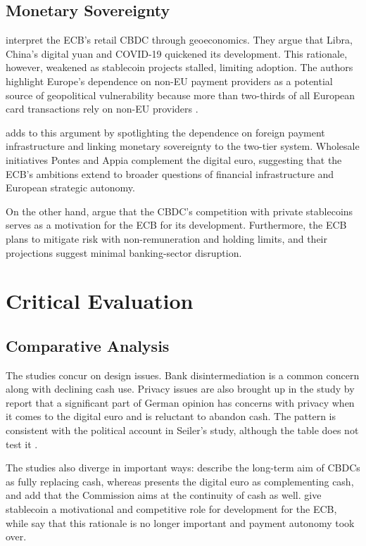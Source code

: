\documentclass[10pt,a4paper,twocolumn]{article}
\begin{document}
\subsection{Monetary Sovereignty}

\textcite{Quaglia2025} interpret the ECB's retail CBDC through geoeconomics. They argue that Libra, China's digital yuan and COVID-19 quickened its development. This rationale, however, weakened as stablecoin projects stalled, limiting adoption. The authors highlight Europe's dependence on non-EU payment providers as a potential source of geopolitical vulnerability because more than two-thirds of all European card transactions rely on non-EU providers \parencite{Quaglia2025}.

\textcite{Cipollone2026a} adds to this argument by spotlighting the dependence on foreign payment infrastructure and linking monetary sovereignty to the two-tier system. Wholesale initiatives Pontes and Appia complement the digital euro, suggesting that the ECB's ambitions extend to broader questions of financial infrastructure and European strategic autonomy.

On the other hand, \textcite{Cotugno2024} argue that the CBDC's competition with private stablecoins serves as a motivation for the ECB for its development. Furthermore, the ECB plans to mitigate risk with non-remuneration and holding limits, and their projections suggest minimal banking-sector disruption.

\vspace{2cm}
\section{Critical Evaluation}

\subsection{Comparative Analysis}

The studies concur on design issues. Bank disintermediation is a common concern along with declining cash use. Privacy issues are also brought up in the study by \textcite{Quaglia2025} report that a significant part of German opinion has concerns with privacy when it comes to the digital euro and is reluctant to abandon cash. The pattern is consistent with the political account in Seiler's study, although the table does not test it \parencite{Seiler2026}.

The studies also diverge in important ways: \textcite{Cotugno2024} describe the long-term aim of CBDCs as fully replacing cash, whereas \textcite{Cipollone2026a} presents the digital euro as complementing cash, and \textcite{Quaglia2025} add that the Commission aims at the continuity of cash as well. \textcite{Cotugno2024} give stablecoin a motivational and competitive role for development for the ECB, while \textcite{Quaglia2025} say that this rationale is no longer important and payment autonomy took over.
\end{document}

